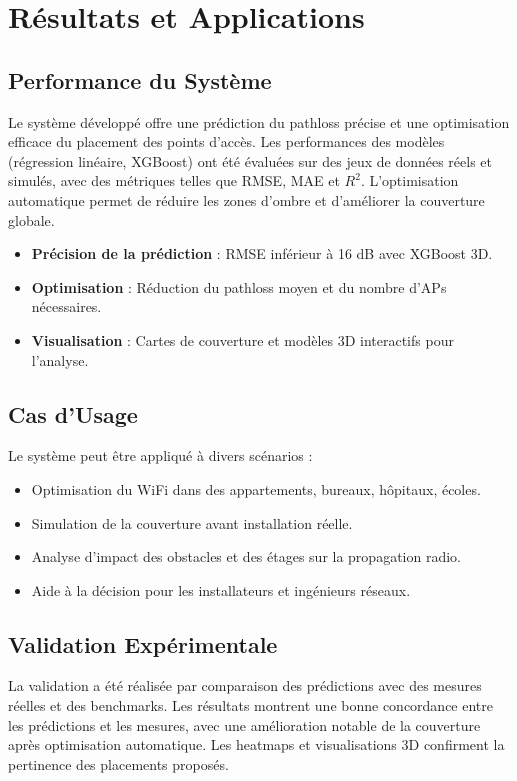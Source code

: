 \documentclass[12pt,a4paper]{article}
\begin{document}
\section{Résultats et Applications}

\subsection{Performance du Système}
Le système développé offre une prédiction du pathloss précise et une optimisation efficace du placement des points d’accès. Les performances des modèles (régression linéaire, XGBoost) ont été évaluées sur des jeux de données réels et simulés, avec des métriques telles que RMSE, MAE et $R^2$. L’optimisation automatique permet de réduire les zones d’ombre et d’améliorer la couverture globale.

\begin{itemize}
    \item \textbf{Précision de la prédiction} : RMSE inférieur à 16 dB avec XGBoost 3D.
    \item \textbf{Optimisation} : Réduction du pathloss moyen et du nombre d’APs nécessaires.
    \item \textbf{Visualisation} : Cartes de couverture et modèles 3D interactifs pour l’analyse.
\end{itemize}

\subsection{Cas d’Usage}
Le système peut être appliqué à divers scénarios :
\begin{itemize}
    \item Optimisation du WiFi dans des appartements, bureaux, hôpitaux, écoles.
    \item Simulation de la couverture avant installation réelle.
    \item Analyse d’impact des obstacles et des étages sur la propagation radio.
    \item Aide à la décision pour les installateurs et ingénieurs réseaux.
\end{itemize}

\subsection{Validation Expérimentale}
La validation a été réalisée par comparaison des prédictions avec des mesures réelles et des benchmarks. Les résultats montrent une bonne concordance entre les prédictions et les mesures, avec une amélioration notable de la couverture après optimisation automatique. Les heatmaps et visualisations 3D confirment la pertinence des placements proposés.
\end{document}
